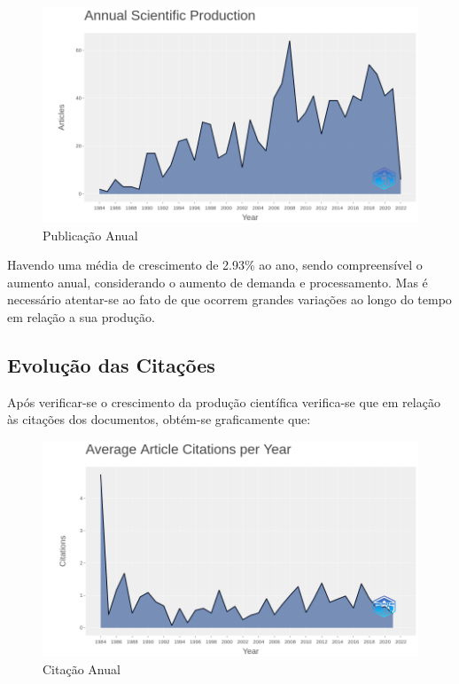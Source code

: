 \begin{figure}[H]
    \centering
    \includegraphics[width=1\textwidth]{experiments/uventura/AnaliseBibliometrica/Images/publicação-anual.png}
    \caption{Publicação Anual}
    \label{fig:uventura:bib-anual-pub}
\end{figure}

Havendo uma média de crescimento de 2.93\% ao ano, sendo compreensível o aumento anual, considerando o aumento de demanda e processamento. Mas é necessário atentar-se ao fato de que ocorrem grandes variações ao longo do tempo em relação a sua produção.

\subsection{Evolução das Citações}

Após verificar-se o crescimento da produção científica verifica-se que em relação às citações dos documentos, obtém-se graficamente que:

\begin{figure}[H]
    \centering
    \includegraphics[width=1\textwidth]{experiments/uventura/AnaliseBibliometrica/Images/citação-anual.png}
    \caption{Citação Anual}
    \label{fig:uventura:bib-anual-cit}
\end{figure}

